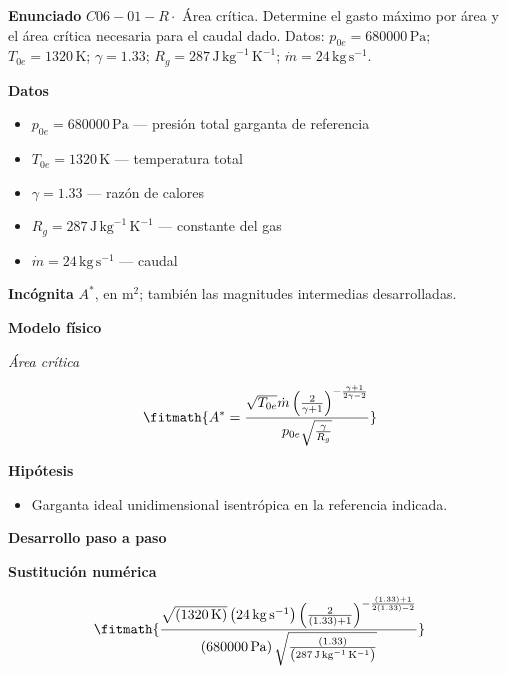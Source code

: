 \documentclass[10pt,openany]{book}
\begin{document}
\begin{tcolorbox}[title={Problema resuelto 1}, studiumworked, breakable]

\noindent\textbf{Enunciado}
\(C06-01-R \cdot\) Área crítica. Determine el gasto máximo por área y el área crítica necesaria para el caudal dado. Datos: \(p_{0e}=680000\, \mathrm{Pa}\); \(T_{0e}=1320\, \mathrm{K}\); \(\gamma=1.33\); \(R_g=287\, \mathrm{J}\,\mathrm{kg}^{-1}\,\mathrm{K}^{-1}\); \(\dot m=24\, \mathrm{kg}\,\mathrm{s}^{-1}\).

\noindent\textbf{Datos}
\begin{itemize}
\item $p_{0e} = 680000\,\mathrm{Pa}$ — presión total garganta de referencia
\item $T_{0e} = 1320\,\mathrm{K}$ — temperatura total
\item $\gamma = 1.33$ — razón de calores
\item $R_g = 287\,\mathrm{J}\,\mathrm{kg}^{-1}\,\mathrm{K}^{-1}$ — constante del gas
\item $\dot m = 24\,\mathrm{kg}\,\mathrm{s}^{-1}$ — caudal
\end{itemize}

\noindent\textbf{Incógnita}
$A^{*}$, en $\mathrm{m^{2}}$; también las magnitudes intermedias desarrolladas.

\noindent\textbf{Modelo físico}

\noindent\textit{Área crítica}

\[
\fitmath{A^{*}=\frac{\sqrt{T_{0e}} \dot m \left(\frac{2}{\gamma + 1}\right)^{- \frac{\gamma + 1}{2 \gamma - 2}}}{p_{0e} \sqrt{\frac{\gamma}{R_g}}}}
\]

\noindent\textbf{Hipótesis}
\begin{itemize}
\item Garganta ideal unidimensional isentrópica en la referencia indicada.
\end{itemize}

\noindent\textbf{Desarrollo paso a paso}



\noindent\textbf{Sustitución numérica}

\[
\fitmath{\frac{\sqrt{\left(1320\,\mathrm{K}\right)} \left(24\,\mathrm{kg}\,\mathrm{s}^{-1}\right) \left(\frac{2}{\left(1.33\right) + 1}\right)^{- \frac{\left(1.33\right) + 1}{2 \left(1.33\right) - 2}}}{\left(680000\,\mathrm{Pa}\right) \sqrt{\frac{\left(1.33\right)}{\left(287\,\mathrm{J}\,\mathrm{kg}^{-1}\,\mathrm{K}^{-1}\right)}}}}
\]


\end{tcolorbox}
\end{document}
